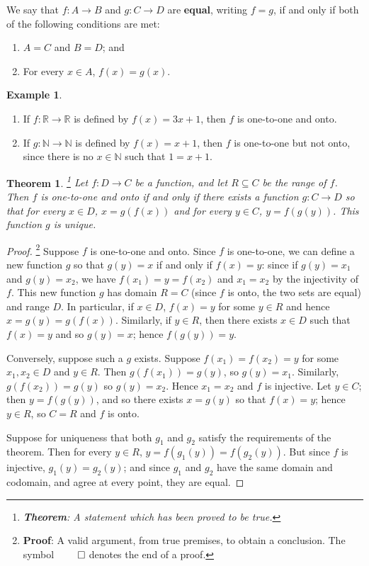 \documentclass[a4paper,leqno]{article}
\numberwithin{equation}{section}
\newtheorem{thm}[equation]{Theorem}
\theoremstyle{definition}
\newtheorem{ex}[equation]{Example}
\theoremstyle{remark}
\newcommand{\df}[1]{\textbf{#1}}
\begin{document}
We say that $ f : A \to B $ and $ g : C \to D $ are \df{equal}, writing $ f = g $, if and only if both of the following conditions are met:
\begin{enumerate}
  \item $ A = C $ and $ B = D $; and
  \item For every $ x \in A $, $ f(x) = g(x) $.
\end{enumerate}

\begin{ex}\leavevmode
  \begin{enumerate}
    \item If $ f : \mathbb{R} \to \mathbb{R} $ is defined by $ f(x) = 3x + 1 $, then $ f $ is one-to-one and onto.
    \item If $ g : \mathbb{N} \to \mathbb{N} $ is defined by $ f(x) = x + 1 $, then $ f $ is one-to-one but not onto, since there is no $ x \in \mathbb{N} $
          such that $ 1 = x + 1 $.
  \end{enumerate}
\end{ex}

\begin{thm}\footnote{\df{Theorem}: A statement which has been proved to be true.}
  Let $ f : D \to C $ be a function, and let $ R \subseteq C $ be the range of $ f $. Then $ f $ is one-to-one and onto if and only if there exists a
  function $ g : C \to D $ so that for every $ x \in D $, $ x = g(f(x)) $ and for every $ y \in C $, $ y = f(g(y)) $. This function $ g $ is unique.
\end{thm}
\begin{proof}\footnote{\df{Proof}: A valid argument, from true premises, to obtain a conclusion. The symbol $ \qed $ denotes the end of a proof.}
  Suppose $ f $ is one-to-one and onto. Since $ f $ is one-to-one, we can define a new function $ g $ so that $ g(y) = x $ if and only if $ f(x) = y $:
  since if $ g(y) = x_1 $ and $ g(y) = x_2 $, we have $ f(x_1) = y = f(x_2) $ and $ x_1 = x_2 $ by the injectivity of $ f $. This new function $ g $
  has domain $ R = C $ (since $ f $ is onto, the two sets are equal) and range $ D $. In particular, if $ x \in D $, $ f(x) = y $ for some $ y \in R $
  and hence $ x = g(y) = g(f(x)) $. Similarly, if $ y \in R $, then there exists $ x \in D $ such that $ f(x) = y $ and so $ g(y) = x $; hence $ f(g(y)) = y $.

  Conversely, suppose such a $ g $ exists. Suppose $ f(x_1) = f(x_2) = y $ for some $ x_1, x_2 \in D $ and $ y \in R $. Then $ g(f(x_1)) = g(y) $, so $ g(y) = x_1 $.
  Similarly, $ g(f(x_2)) = g(y) $ so $ g(y) = x_2 $. Hence $ x_1 = x_2 $ and $ f $ is injective. Let $ y \in C $; then $ y = f(g(y)) $, and so there
  exists $ x = g(y) $ so that $ f(x) = y $; hence $ y \in R $, so $ C = R $ and $ f $ is onto.

  Suppose for uniqueness that both $ g_1 $ and $ g_2 $ satisfy the requirements of the theorem. Then for every $ y \in R $,  $ y = f(g_1(y)) = f(g_2(y)) $. But
  since $ f $ is injective, $ g_1(y) = g_2(y) $; and since $ g_1 $ and $ g_2 $ have the same domain and codomain, and agree at every point, they are equal.
\end{proof}
\end{document}
